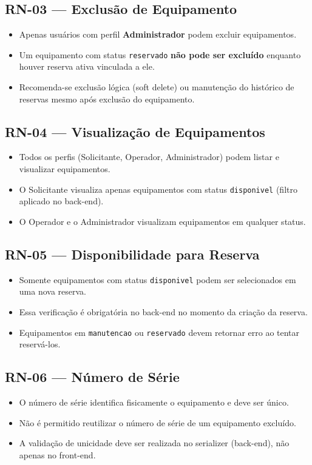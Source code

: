 \documentclass[12pt, a4paper]{article}
\begin{document}
\subsection{RN-03 — Exclusão de Equipamento}
\begin{itemize}
  \item Apenas usuários com perfil \textbf{Administrador} podem excluir equipamentos.
  \item Um equipamento com status \texttt{reservado} \textbf{não pode ser excluído}
        enquanto houver reserva ativa vinculada a ele.
  \item Recomenda-se exclusão lógica (soft delete) ou manutenção do histórico de reservas
        mesmo após exclusão do equipamento.
\end{itemize}

\subsection{RN-04 — Visualização de Equipamentos}
\begin{itemize}
  \item Todos os perfis (Solicitante, Operador, Administrador) podem listar e visualizar
        equipamentos.
  \item O Solicitante visualiza apenas equipamentos com status \texttt{disponivel}
        (filtro aplicado no back-end).
  \item O Operador e o Administrador visualizam equipamentos em qualquer status.
\end{itemize}

\subsection{RN-05 — Disponibilidade para Reserva}
\begin{itemize}
  \item Somente equipamentos com status \texttt{disponivel} podem ser selecionados
        em uma nova reserva.
  \item Essa verificação é obrigatória no back-end no momento da criação da reserva.
  \item Equipamentos em \texttt{manutencao} ou \texttt{reservado} devem retornar erro
        ao tentar reservá-los.
\end{itemize}

\subsection{RN-06 — Número de Série}
\begin{itemize}
  \item O número de série identifica fisicamente o equipamento e deve ser único.
  \item Não é permitido reutilizar o número de série de um equipamento excluído.
  \item A validação de unicidade deve ser realizada no serializer (back-end),
        não apenas no front-end.
\end{itemize}
\end{document}
